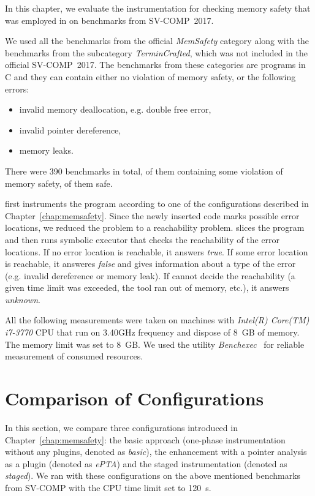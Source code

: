 In this chapter, we evaluate the instrumentation for checking memory safety
that was employed in \symbiotic on benchmarks from SV-COMP~2017.

We used all the benchmarks from the official \emph{MemSafety} category along
with the benchmarks from the subcategory \emph{TerminCrafted}, which was not
included in the official SV-COMP~2017. The benchmarks from these categories are
programs in C and they can contain either no violation of memory safety, or the
following errors:
\begin{itemize}
  \item invalid memory deallocation, e.g. double free error,
  \item invalid pointer dereference,
  \item memory leaks.
\end{itemize}
There were 390 benchmarks in total,  of them containing some violation
of memory safety,  of them safe.

\symbiotic first instruments the program according to one of the configurations
described in Chapter~\ref{chap:memsafety}. Since the newly inserted code marks
possible error locations, we reduced the problem to a reachability problem.
\symbiotic slices the program and then runs symbolic executor \klee
that checks the reachability of the error locations. If no error location is
reachable, it answers \emph{true}. If some error location is reachable, it
answeres \emph{false} and gives information about a type of the error (e.g.
invalid dereference or memory leak). If \symbiotic cannot decide the
reachability (a given time limit was exceeded, the tool ran out of memory,
etc.), it answers \emph{unknown}.

All the following measurements were taken on machines with \textit{Intel(R)
Core(TM) i7-3770} CPU that run on 3.40GHz frequency and dispose of 8~GB of
memory. The memory limit was set to 8~GB. We used the utility
\emph{Benchexec}~\cite{Beyer2015} for reliable measurement of consumed
resources.

\section{Comparison of Configurations}
In this section, we compare three configurations introduced in
Chapter~\ref{chap:memsafety}: the basic approach (one-phase instrumentation
without any plugins, denoted as \emph{basic}), the enhancement with a pointer
analysis as a plugin (denoted as \emph{ePTA}) and the staged instrumentation
(denoted as \emph{staged}). We ran \symbiotic with these configurations on the
above mentioned benchmarks from SV-COMP with the CPU time limit set to 120~s.

